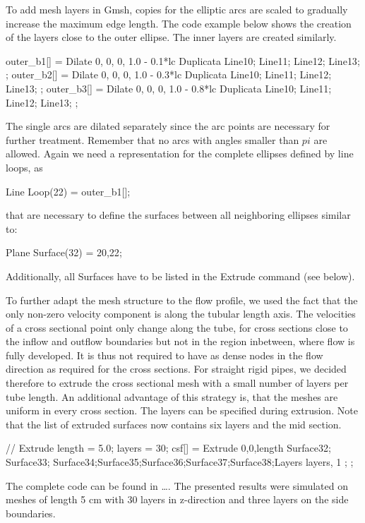 To add mesh layers in Gmsh, copies for the elliptic arcs are scaled to gradually increase the maximum edge length. The code example below shows the creation of the layers close to the outer ellipse. The inner layers are created similarly.
\begin{code}
outer_b1[] = Dilate {{0, 0, 0}, 1.0 - 0.1*lc } { 
Duplicata{  Line{10}; Line{11}; Line{12}; Line{13}; } };
outer_b2[] = Dilate {{0, 0, 0}, 1.0 - 0.3*lc } { 
Duplicata{  Line{10}; Line{11}; Line{12}; Line{13}; } };
outer_b3[] = Dilate {{0, 0, 0}, 1.0 - 0.8*lc } { 
Duplicata{  Line{10}; Line{11}; Line{12}; Line{13}; } };
\end{code}
The single arcs are dilated separately since the arc points are necessary for further treatment. Remember that no arcs with angles smaller than $pi$ are allowed. Again we need a representation for the complete ellipses defined by line loops, as
\begin{code}
Line Loop(22) = {outer_b1[]};
\end{code}
that are necessary to define the surfaces between all neighboring ellipses similar to:
\begin{code}
Plane Surface(32) = {20,22};
\end{code}
Additionally, all Surfaces have to be listed in the Extrude command (see below).


To further adapt the mesh structure to the flow profile, we used the fact that the only non-zero velocity component is along the tubular length axis. The velocities of a cross sectional point only change along the tube, for cross sections close to the inflow and outflow boundaries but not in the region inbetween, where flow is fully developed. It is thus not required to have as dense nodes in the flow direction as required for the cross sections. For straight rigid pipes, we decided therefore to extrude the cross sectional mesh with a small number of layers per tube length. An additional advantage of this strategy is, that the meshes are uniform in every cross section. The layers can be specified during extrusion. Note that the list of extruded surfaces now contains six layers and the mid section.
\begin{code}
// Extrude
length = 5.0;		
layers = 30;		
csf[] = Extrude {0,0,length} {Surface{32}; Surface{33};
   Surface{34};Surface{35};Surface{36};Surface{37};Surface{38};Layers{ {layers}, {1} }; };
\end{code}

The complete code can be found in \ldots. The presented results were simulated on  meshes of length 5 cm with 30 layers in z-direction and three layers on the side boundaries.\\

